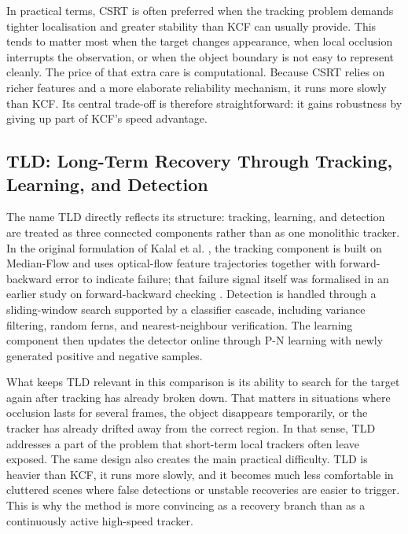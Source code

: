 \documentclass[12pt,a4paper]{article}
\begin{document}
In practical terms, CSRT is often preferred when the tracking problem demands tighter localisation and greater stability than KCF can usually provide. This tends to matter most when the target changes appearance, when local occlusion interrupts the observation, or when the object boundary is not easy to represent cleanly. The price of that extra care is computational. Because CSRT relies on richer features and a more elaborate reliability mechanism, it runs more slowly than KCF. Its central trade-off is therefore straightforward: it gains robustness by giving up part of KCF's speed advantage.

\subsection{TLD: Long-Term Recovery Through Tracking, Learning, and Detection}
The name TLD directly reflects its structure: tracking, learning, and detection are treated as three connected components rather than as one monolithic tracker. In the original formulation of Kalal et al. \cite{kalal2012tld}, the tracking component is built on Median-Flow and uses optical-flow feature trajectories together with forward-backward error to indicate failure; that failure signal itself was formalised in an earlier study on forward-backward checking \cite{kalal2010forwardbackward}. Detection is handled through a sliding-window search supported by a classifier cascade, including variance filtering, random ferns, and nearest-neighbour verification. The learning component then updates the detector online through P-N learning with newly generated positive and negative samples.

What keeps TLD relevant in this comparison is its ability to search for the target again after tracking has already broken down. That matters in situations where occlusion lasts for several frames, the object disappears temporarily, or the tracker has already drifted away from the correct region. In that sense, TLD addresses a part of the problem that short-term local trackers often leave exposed. The same design also creates the main practical difficulty. TLD is heavier than KCF, it runs more slowly, and it becomes much less comfortable in cluttered scenes where false detections or unstable recoveries are easier to trigger. This is why the method is more convincing as a recovery branch than as a continuously active high-speed tracker.
\end{document}

